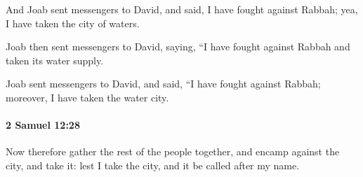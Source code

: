 			\begin{versebox}
					\item[BHS] 
					\item[ASV] And Joab sent messengers to David, and said, I have fought against Rabbah; yea, I have taken the city of waters.
					\item[NIV] Joab then sent messengers to David, saying, “I have fought against Rabbah and taken its water supply.
					\item[NRSV] Joab sent messengers to David, and said, “I have fought against Rabbah; moreover, I have taken the water city.
			\end{versebox}

		\paragraph{2 Samuel 12:28} %
			\label{2SAMUEL-12-28}

			Now therefore gather the rest of the people together, and encamp against the city, and take it: lest I take the city, and it be called after my name.


